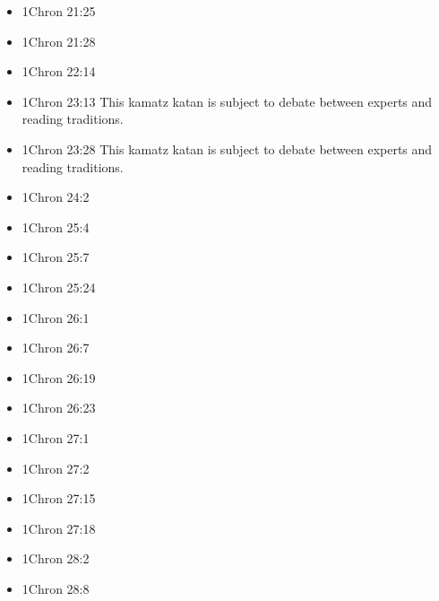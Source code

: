 \documentclass[14pt]{book}
\begin{document}
\begin{multicols}{2}
\begin{itemize}
						\item 1Chron 21:25
						
						\item 1Chron 21:28
						
						\item 1Chron 22:14
						
						\item 1Chron 23:13 This kamatz katan is subject to debate between experts and reading traditions.
						
						\item 1Chron 23:28 This kamatz katan is subject to debate between experts and reading traditions.
						
						\item 1Chron 24:2
						
						\item 1Chron 25:4
						
						\item 1Chron 25:7
						
						\item 1Chron 25:24
						
						\item 1Chron 26:1
						
						\item 1Chron 26:7
						
						\item 1Chron 26:19
						
						\item 1Chron 26:23
						
						\item 1Chron 27:1
						
						\item 1Chron 27:2
						
						\item 1Chron 27:15
						
						\item 1Chron 27:18
						
						\item 1Chron 28:2
						
						\item 1Chron 28:8
						

\end{itemize}
\end{multicols}
\end{document}
